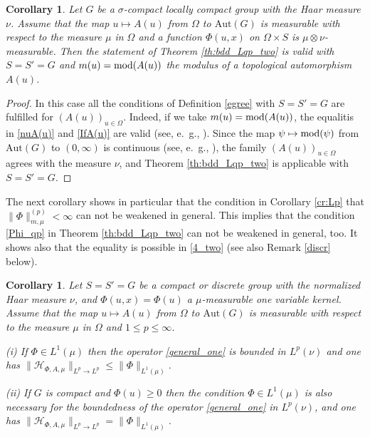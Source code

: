 \documentclass[12pt,reqno]{amsart}
\newtheorem{corollary}[theorem]{Corollary}
\begin{document}
\begin{corollary}\label{cr:Lp_group} Let   $G$ be a $\sigma$-compact locally compact group     with   the Haar measure $\nu$.    Assume that the map $u\mapsto  A(u)$ from $\Omega$ to $\mathrm{Aut}(G)$ is measurable with respect to the measure $\mu$ in $\Omega$ and a  function $\Phi(u,x)$ on $\Omega\times S$ is $\mu\otimes\nu$-measurable. Then the statement of Theorem \ref{th:bdd_Lqp_two} is valid with  $S=S'=G$  and $m(u)={\rm mod}(A(u))$  the modulus of a topological automorphism $A(u)$.
\end{corollary}


\begin{proof} 
  In this case all the conditions of Definition \ref{egree}  with $S=S'=G$    are fulfilled for $(A(u))_{u\in \Omega}$.  Indeed, if we take  $m(u)={\rm mod}(A(u))$,   the equalitis in    \eqref{nuA(u)} and \eqref{IfA(u)}  are valid (see, e.~g., \cite{HiR}).  Since  the map $\psi\mapsto {\rm mod}(\psi)$ from  $\mathrm{Aut}(G)$ to $(0,\infty)$ is continuous (see, e.~g.,  \cite[(26.21)]{HiR}),  the family $(A(u))_{u\in \Omega}$  agrees with the measure $\nu$, and Theorem \ref{th:bdd_Lqp_two} is applicable with   $S=S'=G$. 
\end{proof}



The next corollary shows in particular that the condition in  Corollary \ref{cr:Lp} that  $\|\Phi\|_{m,\mu}^{(p)}<\infty$    can not be weakened in general.  This implies that the condition \eqref{Phi_qp} in Theorem  \ref{th:bdd_Lqp_two}   can not be weakened in general, too. It shows also that the equality is possible in \eqref{4_two} (see also Remark \ref{discr} below).

\begin{corollary}\label{cr:Lp_compactgroup} Let $S=S'=G$ be a compact or discrete  group with   the normalized Haar measure $\nu$, and  $\Phi(u,x)= \Phi(u)$ a $\mu$-measurable one variable kernel.  Assume that the map $u\mapsto  A(u)$ from $\Omega$ to $\mathrm{Aut}(G)$ is measurable with respect to the measure $\mu$ in $\Omega$ and  $1\leq p\le \infty$. 

(i) If $\Phi\in L^1(\mu)$ then the operator \eqref{general_one}
 is bounded in $L^p(\nu)$ and  one has $\|\mathcal{H}_{\Phi, A,\mu}\|_{L^p\to L^p}$$\le \|\Phi\|_{L^1(\mu)}$.
 
 (ii) If $G$ is  compact and $\Phi(u)\ge 0$ then the condition $\Phi\in L^1(\mu)$  is also necessary for the boundedness of   the operator \eqref{general_one} in $L^p(\nu)$,  and one has $\|\mathcal{H}_{\Phi, A,\mu}\|_{L^p\to L^p}$$=\|\Phi\|_{ L^1(\mu)}$.
 \end{corollary}
 
\end{document}
